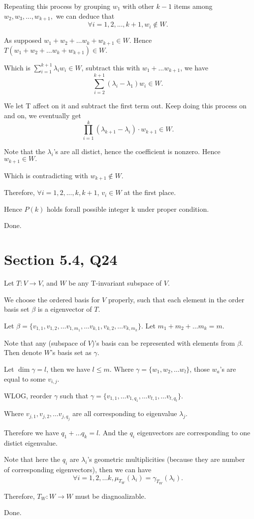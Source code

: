\documentclass[12pt]{article}%
\begin{document}
Repeating this process by grouping $w_1$ with other $k-1$ items among $w_2,w_3,...,w_{k+1},$ we can deduce that $$\forall i=1,2,...,k+1, w_{i} \notin W.$$

As supposed $w_1+w_2+\dots w_k + w_{k+1} \in W.$ Hence $T(w_1+w_2+\dots w_k + w_{k+1} )\in W.$ 

Which is $\sum_{i=1}^{k+1}\lambda_{i}w_i \in W$, subtract this with $w_1+...w_{k+1}$, we have $$\sum_{i=2}^{k+1}(\lambda_{i}-\lambda_1)w_{i} \in W.$$

We let T affect on it and subtract the first term out. Keep doing this process on and on, we eventually get $$\prod_{i=1}^{k}(\lambda_{k+1}-\lambda_i) \cdot w_{k+1} \in W.$$

Note that the $\lambda_i$'s are all distict, hence the coefficient is nonzero. Hence $w_{k+1} \in W.$

Which is contradicting with $w_{k+1} \notin W.$

Therefore, $\forall i=1,2,...,k,k+1$, $v_i \in W$ at the first place.

Hence $P(k)$ holds forall possible integer k under proper condition.

Done.


\section{Section 5.4, Q24}

Let $T:V\to V$, and $W$ be any T-invariant subspace of $V$. 

We choose the ordered basis for $V$ properly, such that each element in the order basis set $\beta$ is a eigenvector of $T$.

Let $\beta = \{v_{1,1},v_{1,2},\dots v_{1,m_1},\dots v_{k,1},v_{k,2},\dots v_{k,m_k}\}.$ Let $m_1+m_2+\dots m_k =m.$

Note that any (subspace of $V$)'s basis can be represented with elements from $\beta$. Then denote $W$'s basis set as $\gamma$.

Let $\dim \gamma=l$, then we have $l\leq m.$ Where $\gamma = \{w_1,w_2,\dots w_l\}$, those $w_a$'s are equal to some $v_{i,j}.$

WLOG, reorder $\gamma$ such that $\gamma=\{v_{1,1},\dots v_{1,q_1} , \dots v_{t,1},\dots v_{t,q_t}\}$. 

Where $v_{j,1},v_{j,2},\dots v_{j,q_j}$ are all corresponding to eigenvalue $\lambda_j.$ 

Therefore we have $q_1+\dots q_k =l.$ And the $q_i$ eigenvectors are corresponding to one distict eigenvalue.

Note that here the $q_i$ are $\lambda_i$'s geometric multiplicities (because they are number of corresponding eigenvectors), then we can have $$\forall i=1,2,\dots k, \mu_{T_{W}}(\lambda_i)=\gamma_{T_{W}}(\lambda_i). $$

Therefore, $T_W:W \to W$ must be diagnoalizable.

Done.
\end{document}
